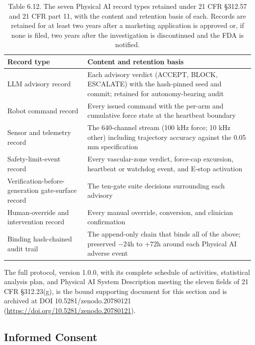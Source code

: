 \begin{table}[t]
\caption{Table 6.12. The seven Physical AI record types retained under 21 CFR
\S 312.57 and 21 CFR part 11, with the content and retention basis of each. Records
are retained for at least two years after a marketing application is approved or, if
none is filed, two years after the investigation is discontinued and the FDA is
notified.}
\label{tab:sec06-records}
\centering
\begin{tabularx}{\textwidth}{L{4.4cm} Y}
\toprule
\textbf{Record type} & \textbf{Content and retention basis} \\
\midrule
LLM advisory record & Each advisory verdict (ACCEPT, BLOCK, ESCALATE) with the hash-pinned seed and commit; retained for autonomy-bearing audit \\
Robot command record & Every issued command with the per-arm and cumulative force state at the heartbeat boundary \\
Sensor and telemetry record & The 640-channel stream (100 kHz force; 10 kHz other) including trajectory accuracy against the 0.05 mm specification \\
Safety-limit-event record & Every vascular-zone verdict, force-cap excursion, heartbeat or watchdog event, and E-stop activation \\
Verification-before-generation gate-surface record & The ten-gate suite decisions surrounding each advisory \\
Human-override and intervention record & Every manual override, conversion, and clinician confirmation \\
Binding hash-chained audit trail & The append-only chain that binds all of the above; preserved $-24$h to $+72$h around each Physical AI adverse event \\
\bottomrule
\end{tabularx}
\end{table}

The full protocol, version 1.0.0, with its complete schedule of activities,
statistical analysis plan, and Physical AI System Description meeting the eleven
fields of 21 CFR \S 312.23(g), is the bound supporting document for this section and
is archived at DOI 10.5281/zenodo.20780121
(\href{https://doi.org/10.5281/zenodo.20780121}{https://doi.org/10.5281/zenodo.20780121}).

\subsection{Informed Consent}

